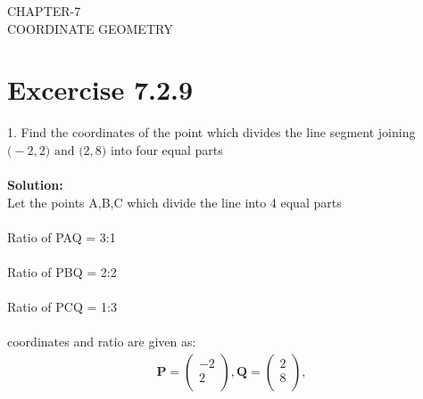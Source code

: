 \documentclass[12pt]{article}
\newcommand{\solution}{\noindent \textbf{Solution: }}
\newcommand{\myvec}[1]{\ensuremath{\begin{pmatrix}#1\end{pmatrix}}}
\let\vec\mathbf
\begin{document}
\begin{center}
\textbf\large{CHAPTER-7 \\ COORDINATE GEOMETRY}
\end{center}
\section*{Excercise 7.2.9}

1. Find the coordinates of the point which divides the line segment joining $\vec(-2,2) \text{ and } \vec(2,8)$ into four equal parts
\\
\\
\solution\\		
Let the points A,B,C which divide the line into 4 equal parts\\
\\
Ratio of PAQ = 3:1\\
\\
Ratio of PBQ = 2:2\\
\\
Ratio of PCQ = 1:3\\
\\
coordinates and ratio are given as:
\begin{align}
\vec{P}=\myvec{-2\\2\\},
\vec{Q}=\myvec{2\\8\\},
\end{align}
\end{document}
